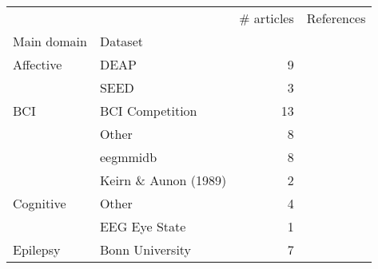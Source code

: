 \begin{tabular}{llrl}
\toprule
      &       &  \# articles &                                                                                                                                                                  References \\
Main domain & Dataset &              &                                                                                                                                                                             \\
\midrule
Affective & DEAP &            9 &                                                            \cite{Li2018, Alhagry2017, BenSaid2017a, Lin2017, Xu2016, Liu2016, Frydenlund2015, Jirayucharoensak2014, Li2013} \\
      & SEED &            3 &                                                                                                                                        \cite{Zhang2018, Liu2016, Zheng2015} \\
BCI & BCI Competition &           13 &  \cite{Gao2018, Lawhern2018, Sakhavi2017, Schirrmeister2017, Schirrmeister2017, Tabar2016a, Tabar2016a, Manor2015, Sakhavi2015, Yang2015a, Ding2015, Ding2015, Cecotti2011} \\
      & Other &            8 &                                                        \cite{Hasib2018, Lawhern2018, Schirrmeister2017, Hajinoroozi2017, Hajinoroozi2017, Hajinoroozi2017, Sun2016, An2016} \\
      & eegmmidb &            8 &                                                                    \cite{Zhang2018c, Zhang2017g, Major2017, Zhang2017d, Zhang2017a, Dharamsi2017, Normand2015, Alomari2013} \\
      & Keirn \& Aunon (1989) &            2 &                                                                                                                                           \cite{Padmanabh2017, Patnaik2017} \\
Cognitive & Other &            4 &                                                                                                        \cite{Kuanar2018, Hajinoroozi2015, Hajinoroozi2015, Hajinoroozi2015} \\
      & EEG Eye State &            1 &                                                                                                                                                           \cite{Narejo2016} \\
Epilepsy & Bonn University &            7 &                                                                 \cite{Hussein2018, Ullah2018, Ahmedt-Aristizabal2018, Talathi2017, Acharya2017, Omerhodzic2013, Naderi2010} \\

\end{tabular}
